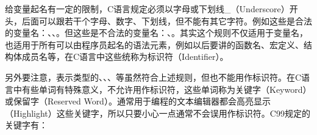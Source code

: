给变量起名有一定的限制，C语言规定必须以字母或下划线\_（Underscore）开头，后面可以跟若干个字母、数字、下划线，但不能有其它字符。例如这些是合法的变量名：、、。但这些是不合法的变量名：、。其实这个规则不仅适用于变量名，也适用于所有可以由程序员起名的语法元素，例如以后要讲的函数名、宏定义、结构体成员名等，在C语言中这些统称为标识符（Identifier）。



另外要注意，表示类型的、、、等虽然符合上述规则，但也不能用作标识符。在C语言中有些单词有特殊意义，不允许用作标识符，这些单词称为关键字（Keyword）或保留字（Reserved Word）。通常用于编程的文本编辑器都会高亮显示（Highlight）这些关键字，所以只要小心一点通常不会误用作标识符。C99规定的关键字有：


